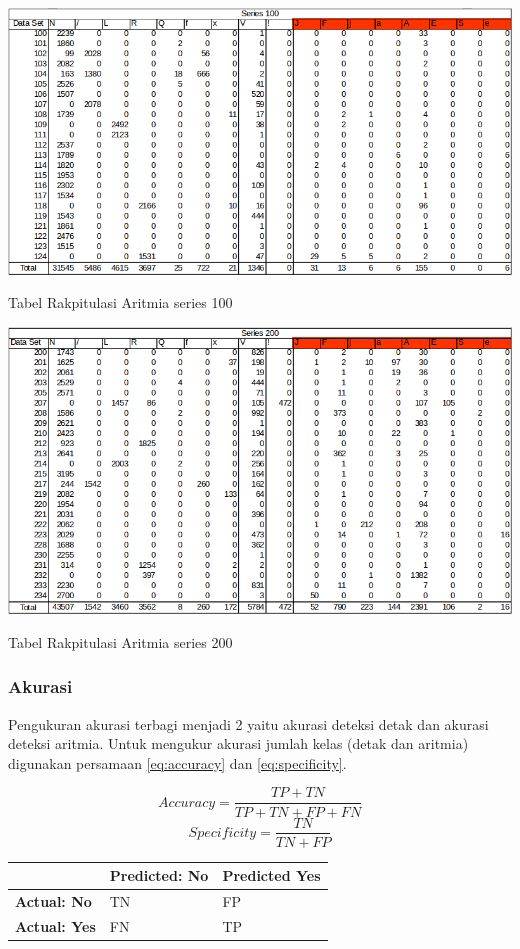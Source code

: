 \begin{table}[H]
	\centering
	\includegraphics[scale=0.5]{images/result1.png}
	\caption{Tabel Rakpitulasi Aritmia series 100}
	\label{tabel:result1}
\end{table}
\begin{table}[H]
	\centering
	\includegraphics[scale=0.5]{images/result2.png}
	\caption{Tabel Rakpitulasi Aritmia series 200}
	\label{tabel:result2}
\end{table}

\subsubsection{Akurasi}
Pengukuran akurasi terbagi menjadi 2 yaitu akurasi deteksi detak dan akurasi deteksi aritmia. Untuk mengukur akurasi jumlah kelas (detak dan aritmia) digunakan persamaan \ref{eq:accuracy} dan \ref{eq:specificity}.

\begin{equation}
	Accuracy = \frac{TP + TN}{TP+TN+FP+FN}
	\label{eq:accuracy}
\end{equation}
\begin{equation}
	Specificity = \frac{TN}{TN+FP}
	\label{eq:specificity}
\end{equation}

\begin{table}
	\centering
	\begin{tabular}{L{3cm}|C{3cm}|C{3cm}|}
	 & \textbf{Predicted: No} & \textbf{Predicted Yes} \\
	\hline
	\textbf{Actual: No} & TN & FP \\
	\hline
	\textbf{Actual: Yes} & FN & TP \\
	\hline	
	\end{tabular}
\end{table}


